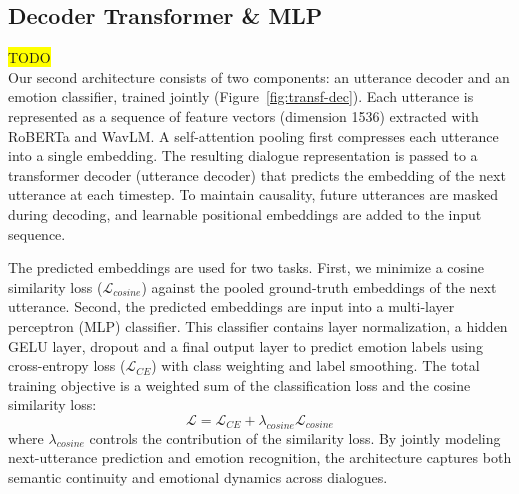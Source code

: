 \documentclass{article}
\begin{document}
\subsection{Decoder Transformer \& MLP}
\colorbox{yellow}{TODO}\\
Our second architecture consists of two components: an utterance decoder and an emotion classifier, trained jointly (Figure~\ref{fig:transf-dec}). Each utterance is represented as a sequence of feature vectors (dimension 1536) extracted with RoBERTa and WavLM. A self-attention pooling first compresses each utterance into a single embedding. The resulting dialogue representation is passed to a transformer decoder (utterance decoder) that predicts the embedding of the next utterance at each timestep. To maintain causality, future utterances are masked during decoding, and learnable positional embeddings are added to the input sequence.

The predicted embeddings are used for two tasks. First, we minimize a cosine similarity loss ($\mathcal{L}_{cosine}$) against the pooled ground-truth embeddings of the next utterance. Second, the predicted embeddings are input into a multi-layer perceptron (MLP) classifier. This classifier contains layer normalization, a hidden GELU layer, dropout and a final output layer to predict emotion labels using cross-entropy loss ($\mathcal{L}_{CE}$) with class weighting and label smoothing. The total training objective is a weighted sum of the classification loss and the cosine similarity loss:
\[
\mathcal{L}=\mathcal{L}_{CE}+ \lambda_{cosine} \mathcal{L}_{cosine}
\]
where $\lambda_{cosine}$ controls the contribution of the similarity loss. By jointly modeling next-utterance prediction and emotion recognition, the architecture captures both semantic continuity and emotional dynamics across dialogues. 
\end{document}
